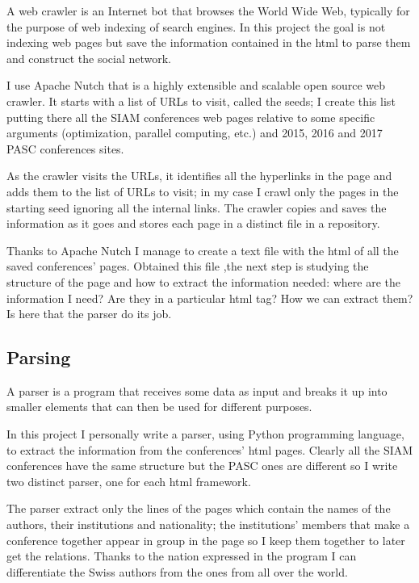 \documentclass[]{usiinfbachelorproject}
\begin{document}
A web crawler is an Internet bot that browses the World Wide Web, typically for the purpose of web indexing of search engines. In this project the goal is not indexing web pages but save the information contained in the html to parse them and construct the social network.

I use Apache Nutch that is a highly extensible and scalable open source web crawler.
It starts with a list of URLs to visit, called the seeds; I create this list putting there all the SIAM conferences web pages relative to some specific arguments (optimization, parallel computing, etc.) and 2015, 2016 and 2017 PASC conferences sites. 

As the crawler visits the URLs, it identifies all the hyperlinks in the page and adds them to the list of URLs to visit; in my case I crawl only the pages in the starting seed ignoring all the internal links. The crawler copies and saves the information as it goes and stores each page in a distinct file in a repository.

Thanks to Apache Nutch I manage to create a text file with the html of all the saved conferences' pages. Obtained this file ,the next step is studying the structure of the page and how to extract the information needed: where are the information I need? Are they in a particular html tag? How we can extract them? Is here that the parser do its job.

\subsection{Parsing}

A parser is a program that receives some data as input and breaks it up into smaller elements that can then be used for different purposes.

In this project I personally write a parser, using Python programming language, to extract the information from the conferences' html pages. Clearly all the SIAM conferences have the same structure but the PASC ones are different so I write two distinct parser, one for each html framework.

The parser extract only the lines of the pages which contain the names of the authors, their institutions and nationality; the institutions' members that make a conference together appear in group in the page so I keep them together to later get the relations. Thanks to the nation expressed in the program I can differentiate the Swiss authors from the ones from all over the world. 
\end{document}
